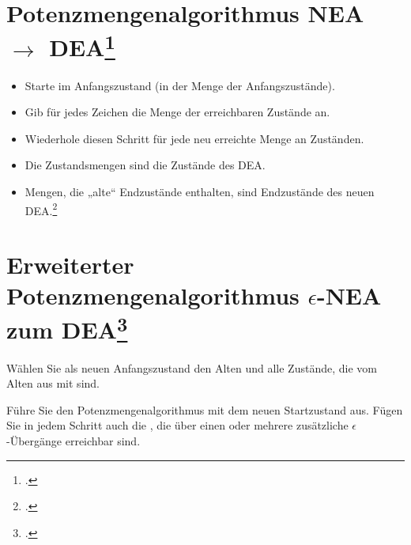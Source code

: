 \documentclass{lehramt-informatik-haupt}
\begin{document}

%

\section{Potenzmengenalgorithmus NEA $\rightarrow$ DEA\footcite[Seite 35-47]{theo:fs:1}}

\begin{itemize}
\item Starte im Anfangszustand (in der Menge der Anfangszustände).

\item Gib für jedes Zeichen die Menge der erreichbaren Zustände an.

\item Wiederhole diesen Schritt für jede neu erreichte Menge an
Zuständen.

\item Die Zustandsmengen sind die Zustände des DEA.

\item Mengen, die „alte“ Endzustände enthalten, sind Endzustände des
neuen DEA.\footcite{wiki:potenzmengenkonstruktion}
\end{itemize}

%

\section{Erweiterter Potenzmengenalgorithmus $\epsilon$-NEA zum
DEA\footcite[Seite 48-49]{theo:fs:1}}

Wählen Sie als neuen Anfangszustand den Alten und alle Zustände, die vom
Alten aus mit  sind.

Führe Sie den Potenzmengenalgorithmus mit dem neuen Startzustand aus.
Fügen Sie in jedem Schritt auch die , die über
einen oder mehrere zusätzliche $\epsilon$-Übergänge erreichbar sind.

\literatur
\end{document}
